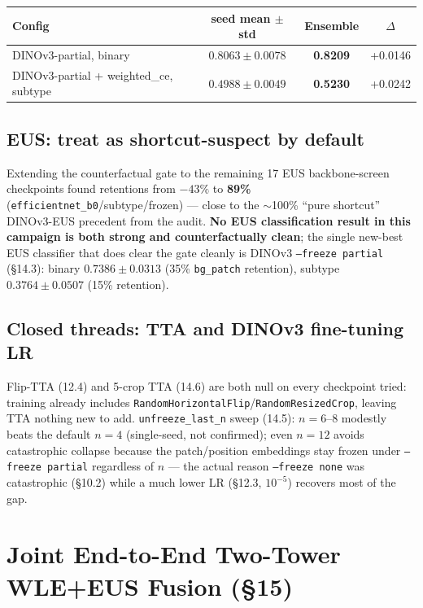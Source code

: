 \documentclass[10pt]{article}
\begin{document}
\begin{center}
\begin{tabular}{lccc}
\toprule
Config & seed mean $\pm$ std & Ensemble & $\Delta$ \\
\midrule
DINOv3-partial, binary & $0.8063\pm0.0078$ & \textbf{0.8209} & +0.0146 \\
DINOv3-partial + weighted\_ce, subtype & $0.4988\pm0.0049$ & \textbf{0.5230} & +0.0242 \\
\bottomrule
\end{tabular}
\end{center}

\subsection{EUS: treat as shortcut-suspect by default}

Extending the counterfactual gate to the remaining 17 EUS backbone-screen checkpoints found retentions from
$-43\%$ to \textbf{89\%} (\texttt{efficientnet\_b0}/subtype/frozen) --- close to the $\sim$100\% ``pure
shortcut'' DINOv3-EUS precedent from the audit. \textbf{No EUS classification result in this campaign is
both strong and counterfactually clean}; the single new-best EUS classifier that does clear the gate
cleanly is DINOv3 \texttt{--freeze partial} (\S14.3): binary $0.7386\pm0.0313$ (35\% \texttt{bg\_patch}
retention), subtype $0.3764\pm0.0507$ (15\% retention).

\subsection{Closed threads: TTA and DINOv3 fine-tuning LR}

Flip-TTA (12.4) and 5-crop TTA (14.6) are both null on every checkpoint tried: training already includes
\texttt{RandomHorizontalFlip}/\texttt{RandomResizedCrop}, leaving TTA nothing new to add.
\texttt{unfreeze\_last\_n} sweep (14.5): $n=6$--8 modestly beats the default $n=4$ (single-seed, not
confirmed); even $n=12$ avoids catastrophic collapse because the patch/position embeddings stay frozen under
\texttt{--freeze partial} regardless of $n$ --- the actual reason \texttt{--freeze none} was catastrophic
(\S10.2) while a much lower LR (\S12.3, $10^{-5}$) recovers most of the gap.

\clearpage
\section{Joint End-to-End Two-Tower WLE+EUS Fusion (\S15)}
\label{sec:fusion2}
\end{document}
